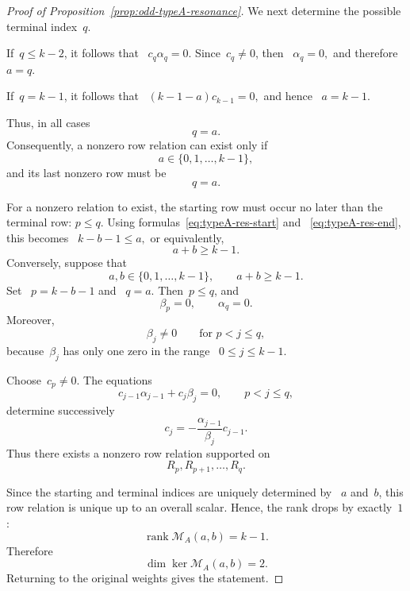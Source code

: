 \documentclass[12pt,a4paper]{amsart}
\theoremstyle{thm}
\theoremstyle{definition}
\begin{document}
\begin{proof}[Proof of Proposition~\textup{\ref{prop:odd-typeA-resonance}}]
We next determine the possible terminal index~\(q\).

If~\(q\leq k-2\), it follows that~%
$
c_q\alpha_q=0.
$ Since~\(c_q\neq0\), then~%
$
\alpha_q=0,
$ and therefore~%
$
a=q.
$

If~\(q=k-1\), it follows that~%
$
(k-1-a)c_{k-1}=0,
$
and hence~%
$
a=k-1.
$

Thus, in all cases
\[
q=a.
\]
Consequently, a nonzero row relation can exist only if
\[
a\in\{0,1,\ldots,k-1\},
\]
and its last nonzero row must be
\begin{equation}
q=a.
\label{eq:typeA-res-end}
\end{equation}

For a nonzero relation to exist, the starting row must occur no later
than the terminal row:
$
p\leq q.
$
Using formulas~\eqref{eq:typeA-res-start} and~%
\eqref{eq:typeA-res-end}, this becomes~%
$
k-b-1\leq a,
$
or equivalently,
\begin{equation*}
a+b\geq k-1.
\end{equation*}
Conversely, suppose that
\[
a,b\in\{0,1,\ldots,k-1\},
\qquad
a+b\geq k-1.
\]
Set~%
$
p=k-b-1$ and~%
$q=a.$ Then~\(p\leq q\), and
\[
\beta_p=0,
\qquad
\alpha_q=0.
\]
Moreover,
\[
\beta_j\neq0
\qquad
\text{for }p<j\leq q,
\]
because~\(\beta_j\) has only one zero in the range~%
\(0\leq j\leq k-1\).

Choose~\(c_p\neq0\). The equations
\[
c_{j-1}\alpha_{j-1}+c_j\beta_j=0,
\qquad
p<j\leq q,
\]
determine successively
\[
c_j
=
-\frac{\alpha_{j-1}}{\beta_j}c_{j-1}.
\]
Thus there exists a nonzero row relation supported on
\[
R_p,R_{p+1},\ldots,R_q.
\]

Since the starting and terminal indices are uniquely determined by~%
\(a\) and~\(b\), this row relation is unique up to an overall scalar.
Hence, the rank drops by exactly~$1$:
\[
\operatorname{rank}\mathcal M_A(a,b)=k-1.
\]
Therefore
\[
\dim\ker\mathcal M_A(a,b)=2.
\]
Returning to the original weights gives the statement.
\end{proof}
\end{document}
